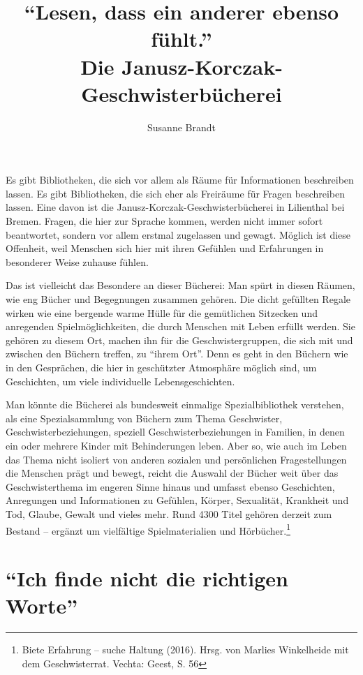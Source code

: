 \documentclass[a4paper,
fontsize=11pt,
oneside,
numbers=noperiodatend,
parskip=half-,
bibliography=totoc,
final
]{scrartcl}
\title{\LARGE{\enquote{Lesen, dass ein anderer ebenso fühlt.}\\ Die
    Janusz-Korczak-Geschwisterbücherei}} %
\author{Susanne Brandt} %
\date{}
\begin{document}
\maketitle
\thispagestyle{fancyplain} 


Es gibt Bibliotheken, die sich vor allem als Räume für Informationen
beschreiben lassen. Es gibt Bibliotheken, die sich eher als Freiräume
für Fragen beschreiben lassen. Eine davon ist die
Janusz-Korczak-Geschwisterbücherei in Lilienthal bei Bremen. Fragen, die
hier zur Sprache kommen, werden nicht immer sofort beantwortet, sondern
vor allem erstmal zugelassen und gewagt. Möglich ist diese Offenheit,
weil Menschen sich hier mit ihren Gefühlen und Erfahrungen in besonderer
Weise zuhause fühlen.

Das ist vielleicht das Besondere an dieser Bücherei: Man spürt in diesen
Räumen, wie eng Bücher und Begegnungen zusammen gehören. Die dicht
gefüllten Regale wirken wie eine bergende warme Hülle für die
gemütlichen Sitzecken und anregenden Spielmöglichkeiten, die durch
Menschen mit Leben erfüllt werden. Sie gehören zu diesem Ort, machen ihn
für die Geschwistergruppen, die sich mit und zwischen den Büchern
treffen, zu \enquote{ihrem Ort}. Denn es geht in den Büchern wie in den
Gesprächen, die hier in geschützter Atmosphäre möglich sind, um
Geschichten, um viele individuelle Lebensgeschichten.

Man könnte die Bücherei als bundesweit einmalige Spezialbibliothek
verstehen, als eine Spezialsammlung von Büchern zum Thema Geschwister,
Geschwisterbeziehungen, speziell Geschwisterbeziehungen in Familien, in
denen ein oder mehrere Kinder mit Behinderungen leben. Aber so, wie auch
im Leben das Thema nicht isoliert von anderen sozialen und persönlichen
Fragestellungen die Menschen prägt und bewegt, reicht die Auswahl der
Bücher weit über das Geschwisterthema im engeren Sinne hinaus und
umfasst ebenso Geschichten, Anregungen und Informationen zu Gefühlen,
Körper, Sexualität, Krankheit und Tod, Glaube, Gewalt und vieles mehr.
Rund 4300 Titel gehören derzeit zum Bestand -- ergänzt um vielfältige
Spielmaterialien und Hörbücher.\footnote{Biete Erfahrung -- suche
  Haltung (2016). Hrsg. von Marlies Winkelheide mit dem Geschwisterrat.
  Vechta: Geest, S. 56}

\section*{\texorpdfstring{\enquote{Ich finde nicht die richtigen
Worte}}{Ich finde nicht die richtigen Worte}}\label{ich-finde-nicht-die-richtigen-worte}
\end{document}
